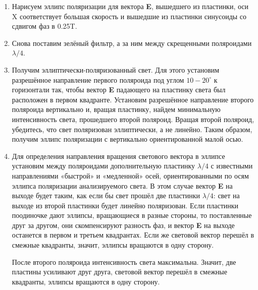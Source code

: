 \begin{enumerate}

    \item Нарисуем эллипс поляризации для вектора \textbf{E}, вышедшего из пластинки, оси X соответствует большая скорость и вышедшие из пластинки синусоиды со сдвигом фаз в 0.25T.
    \begin{figure}[h!]
	    \center{\texttt{[image: 8]}}
    \end{figure}
    \item  Снова поставим зелёный фильтр,
а за ним между скрещенными поляроидами
$\lambda/4$.
\item Получим эллиптически-поляризованный свет. Для этого установим разрешённое направление первого поляроида под углом $10-20^{\circ}$ к горизонтали так, чтобы вектор \textbf{E} падающего на пластинку света был расположен в первом квадранте.
Установим разрешённое направление второго поляроида вертикально и, вращая пластинку, найдем минимальную
интенсивность света, прошедшего второй поляроид. Вращая второй поляроид, убедитесь, что свет поляризован эллиптически,
а не линейно.
Таким образом, получим эллипс поляризации с вертикально ориентированной малой осью.
\item  Для определения направления вращения светового вектора в эллипсе
установим между поляроидами дополнительную пластинку $\lambda/4$ с известными направлениями «быстрой» и «медленной» осей, ориентированными по осям эллипса поляризации анализируемого света.
В этом случае вектор \textbf{E} на выходе будет таким, как если бы свет прошёл две
пластинки $\lambda/4$: свет на выходе из второй пластинки будет линейно поляризован. Если пластинки поодиночке дают эллипсы, вращающиеся в разные стороны, то поставленные друг за другом, они скомпенсируют
разность фаз, и вектор \textbf{E} на выходе останется в первом
и третьем квадрантах. Если
же световой вектор перешёл в смежные квадранты, значит, эллипсы вращаются в одну сторону. 
\par После второго поляроида интенсивность света максимальна. Значит, две пластины усиливают друг друга, световой вектор перешёл в смежные квадранты, эллипсы вращаются в одну сторону.

\end{enumerate}